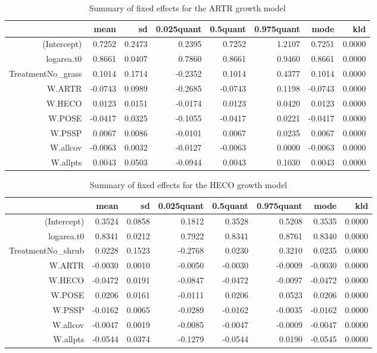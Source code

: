\documentclass[11pt]{article}
\begin{document}
\begin{table}[ht]
\centering
\caption{Summary of fixed effects for the ARTR growth model} 
\label{ARTRgrowth}
\begin{tabular}{rrrrrrrr}
  \hline
 & mean & sd & 0.025quant & 0.5quant & 0.975quant & mode & kld \\ 
  \hline
(Intercept) & 0.7252 & 0.2473 & 0.2395 & 0.7252 & 1.2107 & 0.7251 & 0.0000 \\ 
  logarea.t0 & 0.8661 & 0.0407 & 0.7860 & 0.8661 & 0.9460 & 0.8661 & 0.0000 \\ 
  TreatmentNo\_grass & 0.1014 & 0.1714 & -0.2352 & 0.1014 & 0.4377 & 0.1014 & 0.0000 \\ 
  W.ARTR & -0.0743 & 0.0989 & -0.2685 & -0.0743 & 0.1198 & -0.0743 & 0.0000 \\ 
  W.HECO & 0.0123 & 0.0151 & -0.0174 & 0.0123 & 0.0420 & 0.0123 & 0.0000 \\ 
  W.POSE & -0.0417 & 0.0325 & -0.1055 & -0.0417 & 0.0221 & -0.0417 & 0.0000 \\ 
  W.PSSP & 0.0067 & 0.0086 & -0.0101 & 0.0067 & 0.0235 & 0.0067 & 0.0000 \\ 
  W.allcov & -0.0063 & 0.0032 & -0.0127 & -0.0063 & 0.0000 & -0.0063 & 0.0000 \\ 
  W.allpts & 0.0043 & 0.0503 & -0.0944 & 0.0043 & 0.1030 & 0.0043 & 0.0000 \\ 
   \hline
\end{tabular}
\end{table}

\begin{table}[ht]
\centering
\caption{Summary of fixed effects for the HECO growth model} 
\label{HECOgrowth}
\begin{tabular}{rrrrrrrr}
  \hline
 & mean & sd & 0.025quant & 0.5quant & 0.975quant & mode & kld \\ 
  \hline
(Intercept) & 0.3524 & 0.0858 & 0.1812 & 0.3528 & 0.5208 & 0.3535 & 0.0000 \\ 
  logarea.t0 & 0.8341 & 0.0212 & 0.7922 & 0.8341 & 0.8761 & 0.8340 & 0.0000 \\ 
  TreatmentNo\_shrub & 0.0228 & 0.1523 & -0.2768 & 0.0230 & 0.3210 & 0.0235 & 0.0000 \\ 
  W.ARTR & -0.0030 & 0.0010 & -0.0050 & -0.0030 & -0.0009 & -0.0030 & 0.0000 \\ 
  W.HECO & -0.0472 & 0.0191 & -0.0847 & -0.0472 & -0.0097 & -0.0472 & 0.0000 \\ 
  W.POSE & 0.0206 & 0.0161 & -0.0111 & 0.0206 & 0.0523 & 0.0206 & 0.0000 \\ 
  W.PSSP & -0.0162 & 0.0065 & -0.0289 & -0.0162 & -0.0035 & -0.0162 & 0.0000 \\ 
  W.allcov & -0.0047 & 0.0019 & -0.0085 & -0.0047 & -0.0009 & -0.0047 & 0.0000 \\ 
  W.allpts & -0.0544 & 0.0374 & -0.1279 & -0.0544 & 0.0190 & -0.0545 & 0.0000 \\ 
   \hline
\end{tabular}
\end{table}
\end{document}
